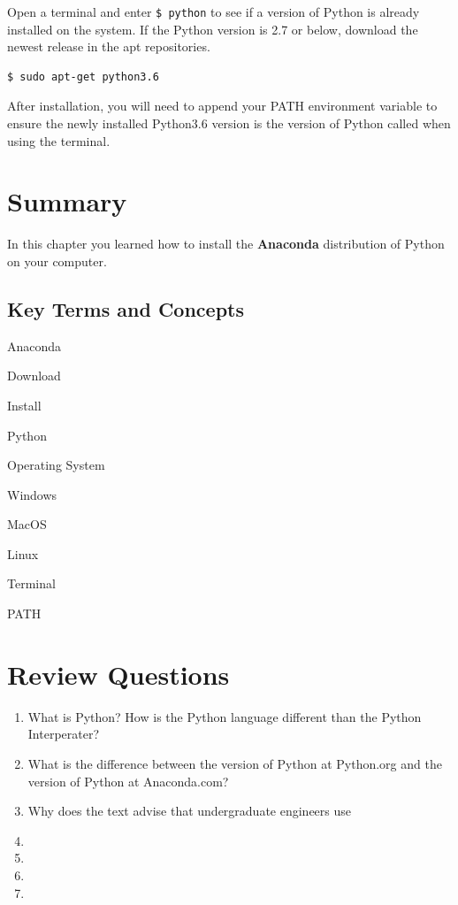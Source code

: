 \documentclass{book}
\begin{document}
Open a terminal and enter \lstinline!$ python! to see if a version of
Python is already installed on the system. If the Python version is 2.7
or below, download the newest release in the apt repositories.

\begin{lstlisting}
$ sudo apt-get python3.6
\end{lstlisting}

After installation, you will need to append your PATH environment
variable to ensure the newly installed Python3.6 version is the version
of Python called when using the terminal.

    \section{Summary}\label{summary}

    In this chapter you learned how to install the \textbf{Anaconda}
distribution of Python on your computer.

    \subsection{Key Terms and Concepts}\label{key-terms-and-concepts}

    Anaconda

Download

Install

Python

Operating System

Windows

MacOS

Linux

Terminal

PATH

    \section{Review Questions}\label{review-questions}

    \begin{enumerate}
\def\labelenumi{\arabic{enumi}.}
\item
  What is Python? How is the Python language different than the Python
  Interperater?
\item
  What is the difference between the version of Python at Python.org and
  the version of Python at Anaconda.com?
\item
  Why does the text advise that undergraduate engineers use
\item
\item
\item
\item
\end{enumerate}
\end{document}
